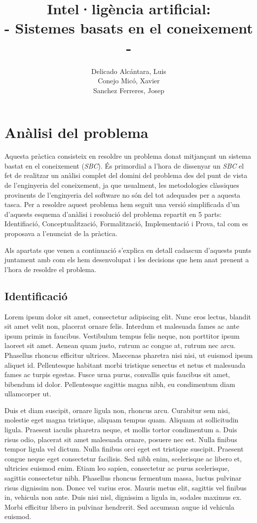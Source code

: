 \documentclass[11pt,a4paper]{article}
\author{
  Delicado Alcántara, Luis
  \\
  Conejo Micó, Xavier
  \\
  Sanchez Ferreres, Josep
}
\title{Intel·ligència artificial:\\ \large{- Sistemes basats en el coneixement -}}
\begin{document}
\maketitle

\newpage

\tableofcontents

\newpage

\section{Anàlisi del problema}
Aquesta pràctica consisteix en resoldre un problema donat mitjançant un sistema bastat en el coneixement (\emph{SBC}). És primordial a l'hora de dissenyar un \emph{SBC} el fet de realitzar un anàlisi complet del domini del problema des del punt de vista de l'enginyeria del coneixement, ja que usualment, les metodologies clàssiques provinents de l'enginyeria del software no són del tot adequades per a aquesta tasca. Per a resoldre aquest problema hem seguit una versió simplificada d'un d'aquests esquema d'anàlisi i resolució del problema repartit en 5 parts: Identifiació, Conceptuaĺització, Formalització, Implementació i Prova, tal com es proposava a l'enunciat de la pràctica.

Als apartats que venen a continuació s'explica en detall cadascun d'aquests punts juntament amb com els hem desenvolupat i les decisions que hem anat prenent a l'hora de resoldre el problema.

\subsection{Identificació}
Lorem ipsum dolor sit amet, consectetur adipiscing elit. Nunc eros lectus, blandit sit amet velit non, placerat ornare felis. Interdum et malesuada fames ac ante ipsum primis in faucibus. Vestibulum tempus felis neque, non porttitor ipsum laoreet sit amet. Aenean quam justo, rutrum ac congue at, rutrum nec arcu. Phasellus rhoncus efficitur ultrices. Maecenas pharetra nisi nisi, ut euismod ipsum aliquet id. Pellentesque habitant morbi tristique senectus et netus et malesuada fames ac turpis egestas. Fusce urna purus, convallis quis faucibus sit amet, bibendum id dolor. Pellentesque sagittis magna nibh, eu condimentum diam ullamcorper ut.

Duis et diam suscipit, ornare ligula non, rhoncus arcu. Curabitur sem nisi, molestie eget magna tristique, aliquam tempus quam. Aliquam at sollicitudin ligula. Praesent iaculis pharetra neque, et mollis tortor condimentum a. Duis risus odio, placerat sit amet malesuada ornare, posuere nec est. Nulla finibus tempor ligula vel dictum. Nulla finibus orci eget est tristique suscipit. Praesent congue neque eget consectetur facilisis. Sed nibh enim, scelerisque ac libero et, ultricies euismod enim. Etiam leo sapien, consectetur ac purus scelerisque, sagittis consectetur nibh. Phasellus rhoncus fermentum massa, luctus pulvinar risus dignissim non. Donec vel varius eros. Mauris metus elit, sagittis vel finibus in, vehicula non ante. Duis nisi nisl, dignissim a ligula in, sodales maximus ex. Morbi efficitur libero in pulvinar hendrerit. Sed accumsan augue id vehicula euismod.
\end{document}
